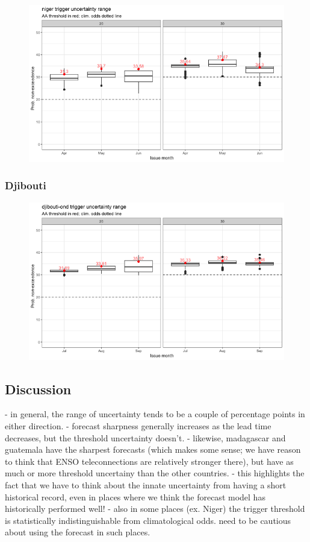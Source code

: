 \documentclass{ametsocV5}
\begin{document}
\begin{figure}
    \centering
    \includegraphics[width=0.9\linewidth]{figures/niger.png}
\end{figure}

\subsubsection{Djibouti}

\begin{figure}
    \centering
    \includegraphics[width=0.9\linewidth]{figures/djibouti-ond.png}
\end{figure}

\subsection{Discussion}

- in general, the range of uncertainty tends to be a couple of percentage points in either direction.
- forecast sharpness generally increases as the lead time decreases, but the threshold uncertainty doesn't.
- likewise, madagascar and guatemala have the sharpest forecasts (which makes some sense; we have reason to think that ENSO teleconnections are relatively stronger there), but have as much or more threshold uncertainy than the other countries.
- this highlights the fact that we have to think about the innate uncertainty from having a short historical record, even in places where we think the forecast model has historically performed well!
- also in some places (ex. Niger) the trigger threshold is statistically indistinguishable from climatological odds. need to be cautious about using the forecast in such places.
\end{document}
